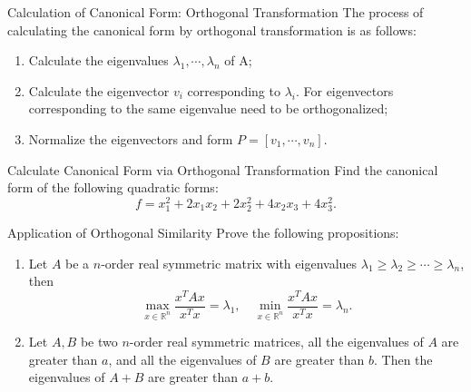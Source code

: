 \begin{proposition}{Calculation of Canonical Form: Orthogonal Transformation}{}
  The process of calculating the canonical form by orthogonal transformation is
  as follows:
  \begin{enumerate}
  \item Calculate the eigenvalues $\lambda_1,\cdots,\lambda_n$ of A;
  \item Calculate the eigenvector $v_i$ corresponding to $\lambda_i$.
    For eigenvectors corresponding to the same eigenvalue need to be orthogonalized;
  \item Normalize the eigenvectors and form $P = [v_1,\cdots,v_n]$.
  \end{enumerate}
\end{proposition}

\begin{example}{Calculate Canonical Form via Orthogonal Transformation}{}
  Find the canonical form of the following quadratic forms:
  \begin{equation}
    f = x_1^2 + 2x_1x_2 + 2x_2^2 + 4x_2x_3 + 4x_3^2.
  \end{equation}
\end{example}

\begin{solution}
  
\end{solution}

\begin{example}{Application of Orthogonal Similarity}{}
  Prove the following propositions:
  \begin{enumerate}
  \item Let $A$ be a $n$-order real symmetric matrix with eigenvalues
    $\lambda_1 \geq \lambda_2 \geq \cdots \geq \lambda_n$, then
    \begin{equation}
      \max \limits_{x \in \mathbb{R}^n} \frac{x^T A x}{x^Tx} = \lambda_1,\quad
      \min \limits_{x \in \mathbb{R}^n} \frac{x^TAx}{x^Tx} = \lambda_n.
    \end{equation}
  \item Let $A, B$ be two $n$-order real symmetric matrices,
    all the eigenvalues of $A$ are greater than $a$,
    and all the eigenvalues of $B$ are greater than $b$.
    Then the eigenvalues of $A + B$ are greater than $a + b$.
  \end{enumerate}
\end{example}

\begin{solution}
  
\end{solution}

